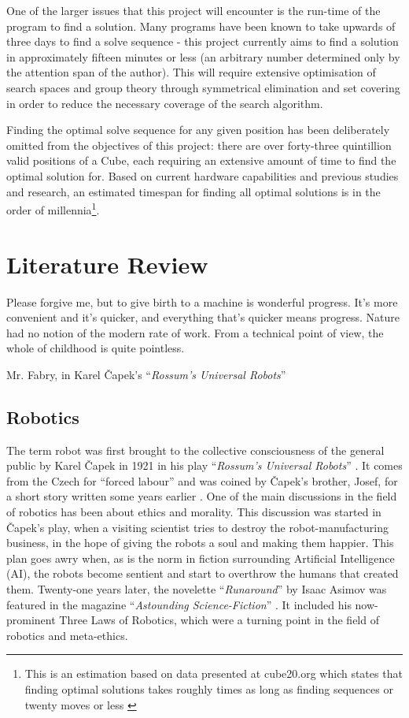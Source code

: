 \documentclass{report}
\newcommand{\tit}[1]{\textit{#1}}
\newcommand{\propernoun}[1]{\enquote{\tit{#1}}}
\begin{document}
    One of the larger issues that this project will encounter is the run-time of the program to find a solution. Many programs have been known to take upwards of three days to find a solve sequence - this project currently aims to find a solution in approximately fifteen minutes or less (an arbitrary number determined only by the attention span of the author). This will require extensive optimisation of search spaces and group theory through symmetrical elimination and set covering in order to reduce the necessary coverage of the search algorithm.
    
    Finding the optimal solve sequence for any given position has been deliberately omitted from the objectives of this project: there are over forty-three quintillion valid positions of a Cube, each requiring an extensive amount of time to find the optimal solution for. Based on current hardware capabilities and previous studies and research, an estimated timespan for finding all optimal solutions is in the order of millennia\footnote{This is an estimation based on data presented at cube20.org which states that finding optimal solutions takes roughly  times as long as finding sequences or twenty moves or less \cite{Rokicki2010}}.
    
    \newpage
    \chapter{Literature Review}
    \epigraph{Please forgive me, but to give birth to a machine is wonderful progress. It's more convenient and it's quicker, and everything that's quicker means progress. Nature had no notion of the modern rate of work. From a technical point of view, the whole of childhood is quite pointless.}{Mr. Fabry, in Karel \v{C}apek's \propernoun{Rossum's Universal Robots} \cite{Capek1921}}
    
    \section{Robotics}
    The term robot was first brought to the collective consciousness of the general public by Karel \v{C}apek in 1921 in his play \propernoun{Rossum's Universal Robots} \cite{Capek1921}. It comes from the Czech for \enquote{forced labour} and was coined by \v{C}apek's brother, Josef, for a short story written some years earlier \cite{Etymonline2017}. One of the main discussions in the field of robotics has been about ethics and morality. This discussion was started in \v{C}apek's play, when a visiting scientist tries to destroy the robot-manufacturing business, in the hope of giving the robots a soul and making them happier. This plan goes awry when, as is the norm in fiction surrounding Artificial Intelligence (AI), the robots become sentient and start to overthrow the humans that created them. Twenty-one years later, the novelette \propernoun{Runaround} by Isaac Asimov was featured in the magazine \propernoun{Astounding Science-Fiction} \cite{Asimov1942}. It included his now-prominent Three Laws of Robotics, which were a turning point in the field of robotics and meta-ethics.
    
\end{document}
